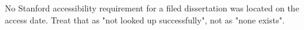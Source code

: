 %
%
%
%


	{No Stanford accessibility requirement for a filed dissertation was located
	 on the access date. Treat that as "not looked up successfully", not as
	 "none exists".}

%
